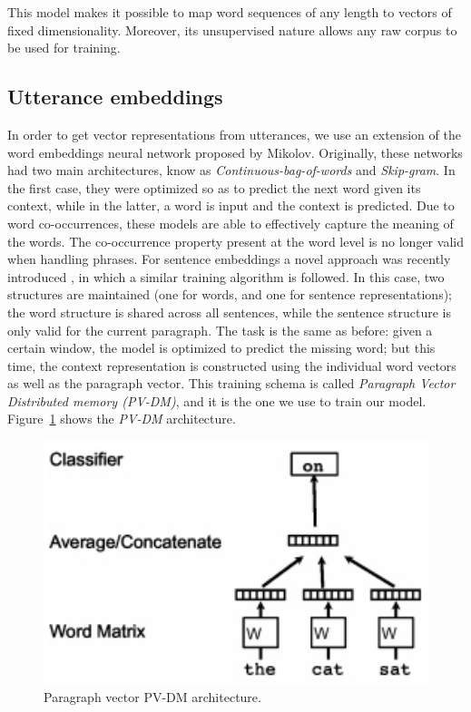 This model makes it possible to map word sequences of any length to vectors of fixed dimensionality. Moreover, its unsupervised nature allows any raw corpus to be used for training.


\subsection{Utterance embeddings} 

In order to get vector representations from utterances, we use an extension of the word embeddings neural network proposed by Mikolov\cite{mikolov2013efficient}. Originally, these networks had two main architectures, know as \emph{Continuous-bag-of-words} and \emph{Skip-gram}. In the first case, they were optimized so as to predict the next word given its context, while in the latter, a word is input and the context is predicted. Due to word co-occurrences, these models are able to effectively capture the meaning of the words. The co-occurrence property present at the word level is no longer valid when handling phrases. For sentence embeddings a novel approach was recently introduced , in which a similar training algorithm is followed. In this case, two structures are maintained (one for words, and one for sentence representations); the word structure is shared across all sentences, while the sentence structure is only valid for the current paragraph. The task is the same as before: given a certain window, the model is optimized to predict the missing word; but this time, the context representation is constructed using the individual word vectors as well as the paragraph vector. This training schema is called \emph{Paragraph Vector Distributed memory (PV-DM)}, and it is the one we use to train our model. Figure~\ref{fig:p2v_arq} shows the \emph{PV-DM} architecture.

\begin{figure}
\centering
\begin{minipage}{.3\textwidth}
\includegraphics[width=1\textwidth]{img/par2vec_arq}
\caption{Paragraph vector PV-DM architecture.}
\label{fig:p2v_arq}
\end{minipage}
\end{figure}

